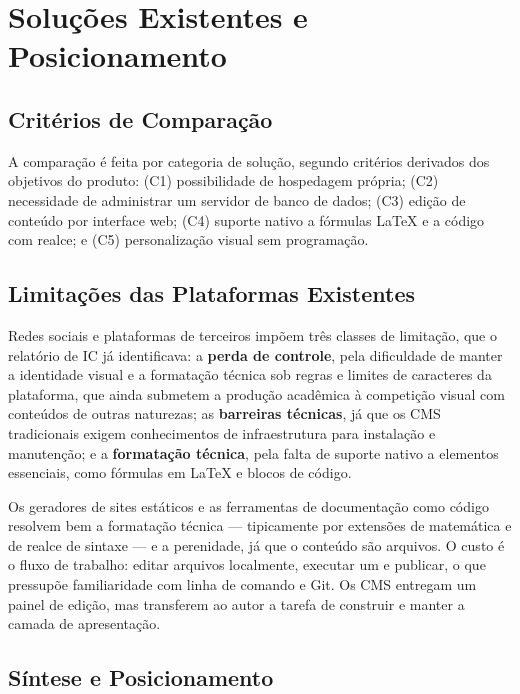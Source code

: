 \section{Soluções Existentes e Posicionamento}\label{sec:trabalhos-relacionados}

\subsection{Critérios de Comparação}

A comparação é feita por categoria de solução, segundo critérios derivados dos objetivos do produto: (C1) possibilidade de hospedagem própria; (C2) necessidade de administrar um servidor de banco de dados; (C3) edição de conteúdo por interface web; (C4) suporte nativo a fórmulas \LaTeX{} e a código com realce; e (C5) personalização visual sem programação.

\subsection{Limitações das Plataformas Existentes}

Redes sociais e plataformas de terceiros impõem três classes de limitação, que o relatório de IC \cite{reis2026ic} já identificava: a \textbf{perda de controle}, pela dificuldade de manter a identidade visual e a formatação técnica sob regras e limites de caracteres da plataforma, que ainda submetem a produção acadêmica à competição visual com conteúdos de outras naturezas; as \textbf{barreiras técnicas}, já que os CMS tradicionais exigem conhecimentos de infraestrutura para instalação e manutenção; e a \textbf{formatação técnica}, pela falta de suporte nativo a elementos essenciais, como fórmulas em \LaTeX{} e blocos de código.

Os geradores de sites estáticos e as ferramentas de documentação como código resolvem bem a formatação técnica --- tipicamente por extensões de matemática e de realce de sintaxe --- e a perenidade, já que o conteúdo são arquivos. O custo é o fluxo de trabalho: editar arquivos localmente, executar um  e publicar, o que pressupõe familiaridade com linha de comando e Git. Os CMS  entregam um painel de edição, mas transferem ao autor a tarefa de construir e manter a camada de apresentação.

\subsection{Síntese e Posicionamento}

